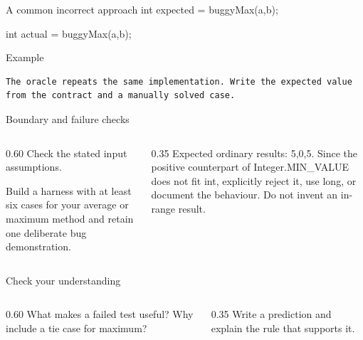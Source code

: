 \documentclass[10pt,aspectratio=169]{beamer}
\begin{document}
\begin{frame}[fragile,t]{A common incorrect approach}
int expected = buggyMax(a,b);\par int actual = buggyMax(a,b);
\vspace{1mm}\begin{block}{Example}
\begin{lstlisting}
The oracle repeats the same implementation. Write the expected value from the contract and a manually solved case.
\end{lstlisting}
\end{block}
\end{frame}

\begin{frame}[fragile,t]{Boundary and failure checks}
\begin{columns}[T,onlytextwidth]\begin{column}{0.60\textwidth}
Check the stated input assumptions.

Build a harness with at least six cases for your average or maximum method and retain one deliberate bug demonstration.
\end{column}\begin{column}{0.35\textwidth}\small
Expected ordinary results: 5,0,5. Since the positive counterpart of Integer.MIN\_VALUE does not fit int, explicitly reject it, use long, or document the behaviour. Do not invent an in-range result.
\end{column}\end{columns}
\end{frame}

\begin{frame}[fragile,t]{Check your understanding}
\begin{columns}[T,onlytextwidth]\begin{column}{0.60\textwidth}
What makes a failed test useful? Why include a tie case for maximum?
\end{column}\begin{column}{0.35\textwidth}\small
Write a prediction and explain the rule that supports it.
\end{column}\end{columns}
\end{frame}
\end{document}
